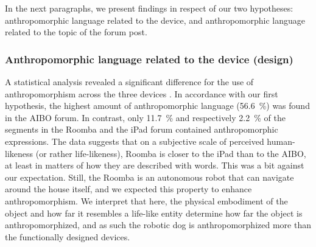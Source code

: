 \documentclass{frontiersSCNS} %
\begin{document}
In the next paragraphs, we present findings in respect of our two hypotheses:
anthropomorphic language related to the device, and anthropomorphic language
related to the topic of the forum post.



\subsubsection{Anthropomorphic language related to the device (design)\\}

A statistical analysis revealed a significant difference for the use of
anthropomorphism across the three devices \citep{fink_anthropomorphic_2012}. In
accordance with our first hypothesis, the highest amount of anthropomorphic
language (56.6~\%) was found in the AIBO forum. In contrast, only 11.7~\% and
respectively 2.2~\% of the segments in the Roomba and the iPad forum contained
anthropomorphic expressions.  The data suggests that on a subjective scale of
perceived human-likeness (or rather life-likeness), Roomba is closer to the iPad
than to the AIBO, at least in matters of how they are described with words. This
was a bit against our expectation. Still, the Roomba is an autonomous robot that
can navigate around the house itself, and we expected this property to enhance
anthropomorphism. We interpret that here, the physical embodiment of the object
and how far it resembles a life-like entity determine how far the object is
anthropomorphized, and as such the robotic dog is anthropomorphized more than
the functionally designed devices.
\end{document}

